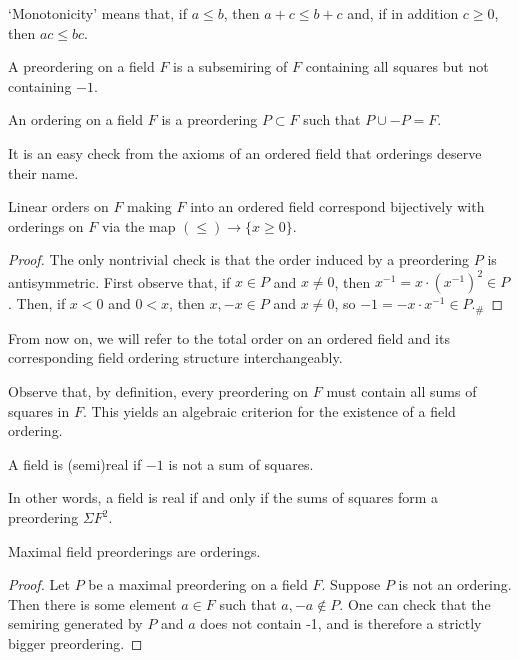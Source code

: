 `Monotonicity' means that, if $a\leq b$, then $a+c\leq b+c$ and, if in addition $c\geq0$, then $ac\leq bc$.

\begin{definition}
  \label{def:preordering}
  \leanok
  A preordering on a field $F$ is a subsemiring of $F$ containing all squares but not containing $-1$.
\end{definition}

\begin{definition}
  \label{def:ordering}
  \leanok
  An ordering on a field $F$ is a preordering $P\subset F$ such that $P\cup -P=F$.
\end{definition}

It is an easy check from the axioms of an ordered field that orderings deserve their name.

\begin{lemma}
  \label{lem:linord_fieldord_bij}
  \leanok
  Linear orders on $F$ making $F$ into an ordered field correspond bijectively with orderings on $F$ via the map $(\leq)\to\{x\geq0\}$.
\end{lemma}
\begin{proof}
  \leanok
  The only nontrivial check is that the order induced by a preordering $P$ is antisymmetric. First observe that, if $x\in P$ and $x\neq0$, then $x^{-1}=x\cdot(x^{-1})^2\in P$. Then, if $x<0$ and $0<x$, then $x,-x\in P$ and $x\neq0$, so $-1=-x\cdot x^{-1}\in P$.$_\#$
\end{proof}

From now on, we will refer to the total order on an ordered field and its corresponding field ordering structure interchangeably.

Observe that, by definition, every preordering on $F$ must contain all sums of squares in $F$. This yields an algebraic criterion for the existence of a field ordering.

\begin{definition}
  \label{def:semireal}
  \leanok
  A field is (semi)real if $-1$ is not a sum of squares.
\end{definition}

In other words, a field is real if and only if the sums of squares form a preordering $\Sigma F^2$.

\begin{lemma}
  \label{lem:max_preord_is_ord}
  \leanok
  Maximal field preorderings are orderings.
\end{lemma}
\begin{proof}
  \leanok
  Let $P$ be a maximal preordering on a field $F$. Suppose $P$ is not an ordering. Then there is some element $a\in F$ such that $a,-a\notin P$. One can check that the semiring generated by $P$ and $a$ does not contain -1, and is therefore a strictly bigger preordering.
\end{proof}

